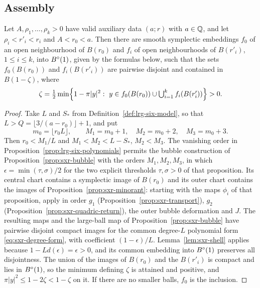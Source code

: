 \subsection{Assembly}\label{sec:sxr-proof}

\begin{theorem}[One large ball, $n=3$]\label{thm:lrg-six}\label{thm:sxr-packing}
Let $A,\rho_1,\dots,\rho_k>0$ have valid auxiliary data $(a;r)$ with $a\in\mathbb{Q}$, and let $\rho_i<r'_i<r_i$ and
$A<r_0<a$. Then there are smooth symplectic embeddings $f_0$ of an open neighbourhood of $B(r_0)$ and $f_i$ of open
neighbourhoods of $B(r'_i)$, $1\le i\le k$, into $B^{\circ}(1)$, given by the formulas below, such that the sets $f_0(B(r_0))$
and $f_i(B(r'_i))$ are pairwise disjoint and contained in $B(1-\zeta)$, where
\[
 \zeta=\tfrac12\min\Bigl\{1-\pi|y|^2:\ y\in\textstyle f_0(B(r_0))\cup\bigcup_{i=1}^kf_i(B(r'_i))\Bigr\}>0 .
\]
\end{theorem}

\begin{proof}
Take $L$ and $S_*$ from Definition~\ref{def:lrg-six-model}, so that $L>Q=\lfloor3/(a-r_0)\rfloor+1$, and put
\[
 m_0=\lfloor r_0L\rfloor,\qquad M_1=m_0+1,\quad M_2=m_0+2,\quad M_3=m_0+3 .
\]
Then $r_0<M_1/L$ and $M_1<M_2<L-S_*$, $M_2<M_3$. The vanishing order in Proposition~\ref{prop:lrg-six-polynomials}
permits the bubble construction of Proposition~\ref{prop:sxr-bubble} with the orders $M_1,M_2,M_3$, in which
$\epsilon=\min(\tau,\sigma)/2$ for the two explicit thresholds $\tau,\sigma>0$ of that proposition. Its central chart
contains a symplectic image of $B(r_0)$ and its outer chart contains the images of
Proposition~\ref{prop:sxr-minorant}: starting with the maps $\phi_i$ of that proposition, apply in order $g_1$ (Proposition~\ref{prop:sxr-transport}), $g_2$
(Proposition~\ref{prop:sxr-quadric-return}), the outer bubble deformation and $J$. The resulting maps and the large-ball map of Proposition~\ref{prop:sxr-bubble} have
pairwise disjoint compact images for the common degree-$L$ polynomial form \eqref{eq:sxr-degree-form}, with coefficient
$(1-\epsilon)/L$. Lemma~\ref{lem:sxr-shell} applies because $1-Ld(\epsilon)=\epsilon>0$, and its common embedding into
$B^{\circ}(1)$ preserves all disjointness. The union of the images of $B(r_0)$ and the $B(r'_i)$ is compact and lies in $B^{\circ}(1)$, so
the minimum defining $\zeta$ is attained and positive, and $\pi|y|^2\le1-2\zeta<1-\zeta$ on it. If there are no smaller
balls, $f_0$ is the inclusion.
\end{proof}
